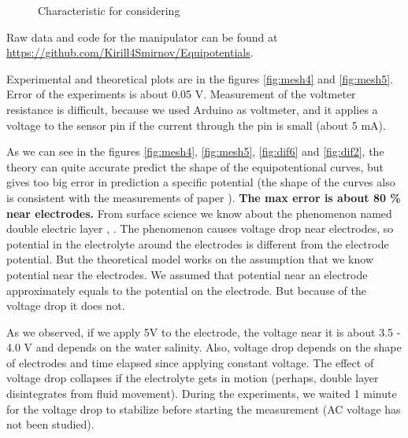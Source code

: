 \documentclass{article}
\begin{document}
\begin{figure}[htb!]
\begin{center}
\end{center}
\caption{Characteristic for considering}
\label{fig:VAC}
\end{figure}

Raw data and code for the manipulator can be found at \url{https://github.com/Kirill4Smirnov/Equipotentials}. \par

Experimental and theoretical plots are in the figures \ref{fig:mesh4} and \ref{fig:mesh5}. Error of the experiments is about 0.05 V. Measurement of the voltmeter resistance is difficult, because we used Arduino as voltmeter, and it applies a voltage to the sensor pin if the current through the pin is small (about 5 mA). \par


As we can see in the figures \ref{fig:mesh4}, \ref{fig:mesh5}, \ref{fig:dif6} and \ref{fig:dif2}, the theory can quite accurate predict the shape of the equipotentional curves, but gives too big error in prediction a specific potential (the shape of the curves also is consistent with the measurements of paper \cite{binder2015high}). \textbf{The max error is about 80 \% near electrodes.} From surface science we know about the phenomenon named double electric layer \cite{kinetika}, \cite{stillinger}. The phenomenon causes voltage drop near electrodes, so potential in the electrolyte around the electrodes is different from the electrode potential. But the theoretical model works on the assumption that we know potential near the electrodes. We assumed that potential near an electrode approximately equals to the potential on the electrode. But because of the voltage drop it does not. \par


As we observed, if we apply 5V to the electrode, the voltage near it is about 3.5 - 4.0 V and depends on the water salinity. Also, voltage drop depends on the shape of electrodes and time elapsed since applying constant voltage. The effect of voltage drop collapses if the electrolyte gets in motion (perhaps, double layer disintegrates from fluid movement). During the experiments, we waited 1 minute for the voltage drop to stabilize before starting the measurement (AC voltage has not been studied).\par
\end{document}
